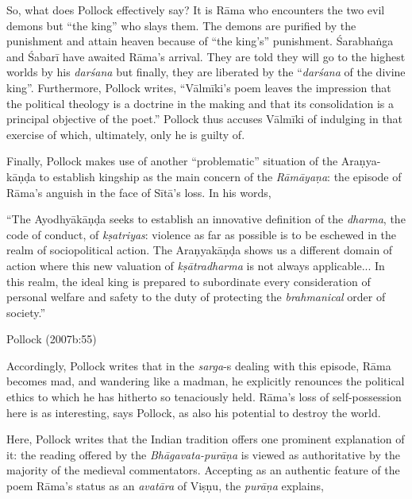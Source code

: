 So, what does Pollock effectively say? It is Rāma who encounters the two evil demons but “the king” who slays them. The demons are purified by the punishment and attain heaven because of “the king’s” punishment. Śarabhaṅga and Śabarī have awaited Rāma’s arrival. They are told they will go to the highest worlds by his {\sl darśana} but finally, they are liberated by the “{\sl darśana} of the divine king”. Furthermore, Pollock writes, “Vālmīki’s poem leaves the impression that the political theology is a doctrine in the making and that its consolidation is a principal objective of the poet.” Pollock thus accuses Vālmīki of indulging in that exercise of which, ultimately, only he is guilty of. 

Finally, Pollock makes use of another “problematic” situation of the Araṇya-kāṇḍa to establish kingship as the main concern of the {\sl Rāmāyaṇa}: the episode of Rāma’s anguish in the face of Sītā’s loss. In his words, 

\begin{myquote}
“The Ayodhyākāṇḍa seeks to establish an innovative definition of the {\sl dharma}, the code of conduct, of {\sl kṣatriyas}: violence as far as possible is to be eschewed in the realm of sociopolitical action. The Araṇyakāṇḍa shows us a different domain of action where this new valuation of {\sl kṣātradharma} is not always applicable... In this realm, the ideal king is prepared to subordinate every consideration of personal welfare and safety to the duty of protecting the {\sl brahmanical} order of society.”

\hfill	 Pollock (2007b:55)
\end{myquote}

Accordingly, Pollock writes that in the {\sl sarga}-s dealing with this episode, Rāma becomes mad, and wandering like a madman, he explicitly renounces the political ethics to which he has hitherto so tenaciously held. Rāma’s loss of self-possession here is as interesting, says Pollock, as also his potential to destroy the world. 

Here, Pollock writes that the Indian tradition offers one prominent explanation of it: the reading offered by the {\sl Bhāgavata-purāṇa} is viewed as authoritative by the majority of the medieval commentators. Accepting as an authentic feature of the poem Rāma’s status as an {\sl avatāra} of Viṣṇu, the {\sl purāṇa} explains, 

